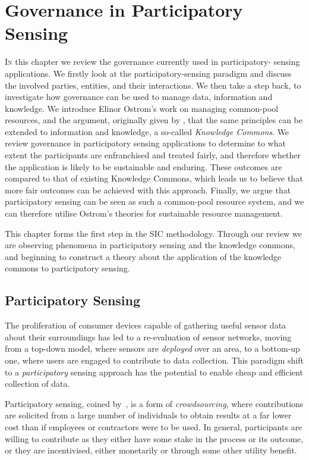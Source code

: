 \acresetall
\chapter{Governance in Participatory Sensing}\label{ch:kc}

\lettrine[lines=3]{I}{n} this chapter we review the governance currently used in participatory-
sensing applications. We firstly look at the participatory-sensing paradigm
and discuss the involved parties, entities, and their interactions. We then
take a step back, to investigate how governance can be used to manage data,
information and knowledge. We introduce Elinor Ostrom's work on managing
common-pool resources, and the argument, originally given by
\citet{Ostrom2003}, that the same principles can be extended to information
and knowledge, a so-called \emph{Knowledge Commons}. We review governance in participatory sensing
applications to determine to what extent the participants are enfranchised and
treated fairly, and therefore whether the application is likely to be
sustainable and enduring. These outcomes are compared to that of existing
Knowledge Commons, which leads us to believe that more fair outcomes can be
achieved with this approach. Finally, we argue that
participatory sensing can be seen as such a common-pool resource system, and we can
therefore utilise Ostrom's theories for sustainable resource
management. 

This chapter forms the first step in the \ac{SIC} methodology. Through our
review we are observing phenomena in participatory sensing and the knowledge
commons, and beginning to construct a theory about the application of the
knowledge commons to participatory sensing.

\section{Participatory Sensing}\label{sec:psense}

The proliferation of consumer devices capable of gathering useful sensor data
about their surroundings has led to a re-evaluation of sensor networks, moving
from a top-down model, where sensors are \emph{deployed} over an area, to a
bottom-up one, where users are engaged to contribute to data collection. This
paradigm shift to a \emph{participatory} sensing approach has the potential to
enable cheap and efficient collection of data.

Participatory sensing, coined by~\citet{Burke2006}, is a form of
\emph{crowdsourcing}, where contributions are solicited from a large number of
individuals to obtain results at a far lower cost than if employees or
contractors were to be used. In general, participants are willing to
contribute as they either have some stake in the process or its outcome, or
they are incentivised, either monetarily or through some other utility
benefit.

